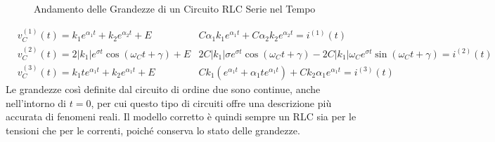 \documentclass{article}
\numberwithin{equation}{subsection}
\begin{document}
\begin{figure}[H]%
    \centering
    \qquad
    \caption{Andamento delle Grandezze di un Circuito RLC Serie nel Tempo}%
    \label{fig:andamento-rlc-serie}
\end{figure}
\begin{align*}
    &v_C^{(1)}(t)=k_1e^{\alpha_1t}+k_2e^{\alpha_2t}+E     &C\alpha_1k_1e^{\alpha_1t}+C\alpha_2k_2e^{\alpha_2t}=i^{(1)}(t)\\
    &v_C^{(2)}(t)=2|k_1|e^{\sigma t}\cos(\omega_Ct+\gamma)+E     &2C|k_1|\sigma e^{\sigma t}\cos(\omega_Ct+\gamma)-2C|k_1|\omega_Ce^{\sigma t}\sin(\omega_Ct+\gamma)=i^{(2)}(t)\\
    &v_C^{(3)}(t)=k_1te^{\alpha_1t}+k_2e^{\alpha_1t}+E     &Ck_1(e^{\alpha_1t}+\alpha_1te^{\alpha_1t})+Ck_2\alpha_1e^{\alpha_1t}=i^{(3)}(t)
\end{align*}
Le grandezze così definite dal circuito di ordine due sono continue, anche nell'intorno di $t=0$, per cui questo tipo di circuiti offre una descrizione più accurata di 
fenomeni reali. Il modello corretto è quindi sempre un RLC sia per le tensioni che per le correnti, poiché conserva lo stato delle grandezze. 
\end{document}
